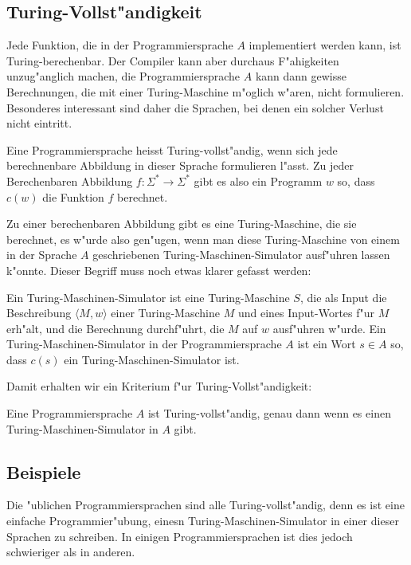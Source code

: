 \subsection{Turing-Vollst"andigkeit}
Jede Funktion, die in der Programmiersprache $A$ implementiert werden
kann, ist Turing-berechenbar.
Der Compiler kann
aber durchaus F"ahigkeiten unzug"anglich machen, die Programmiersprache
$A$ kann dann gewisse Berechnungen, die mit einer Turing-Maschine
m"oglich w"aren, nicht formulieren. Besonderes interessant sind daher
die Sprachen, bei denen ein solcher Verlust nicht eintritt.

\begin{definition}
Eine Programmiersprache heisst Turing-vollst"andig, wenn sich jede 
berechnenbare Abbildung in dieser Sprache formulieren l"asst. Zu
jeder Berechenbaren Abbildung $f\colon\Sigma^*\to \Sigma^*$ gibt
es also ein Programm $w$ so, dass $c(w)$ die Funktion $f$ berechnet.
\end{definition}

Zu einer berechenbaren Abbildung gibt es eine Turing-Maschine, die
sie berechnet, es w"urde also gen"ugen, wenn man diese Turing-Maschine
von einem in der Sprache $A$ geschriebenen Turing-Maschinen-Simulator
ausf"uhren lassen k"onnte. Dieser Begriff muss noch etwas klarer gefasst
werden:

\begin{definition}
Ein Turing-Maschinen-Simulator ist eine Turing-Maschine $S$, die als Input
die Beschreibung $\langle M,w\rangle$ einer Turing-Maschine $M$ und eines
Input-Wortes f"ur $M$ erh"alt, und die Berechnung durchf"uhrt, die $M$ auf $w$ 
ausf"uhren w"urde.
Ein Turing-Maschinen-Simulator in der Programmiersprache $A$ ist
ein Wort $s\in A$ so, dass $c(s)$ ein Turing-Maschinen-Simulator ist.
\end{definition}

Damit erhalten wir ein Kriterium f"ur Turing-Vollst"andigkeit: 

\begin{satz}
\label{turingvollstaendigkeitskriterium}
Eine Programmiersprache $A$ ist Turing-vollst"andig, genau dann
wenn es einen Turing-Maschinen-Simulator in $A$ gibt.
\end{satz}


\subsection{Beispiele}
Die "ublichen Programmiersprachen sind alle Turing-vollst"andig, denn es
ist eine einfache Programmier"ubung, einesn Turing-Maschinen-Simulator
in einer dieser Sprachen zu schreiben. In einigen Programmiersprachen
ist dies jedoch schwieriger als in anderen.

